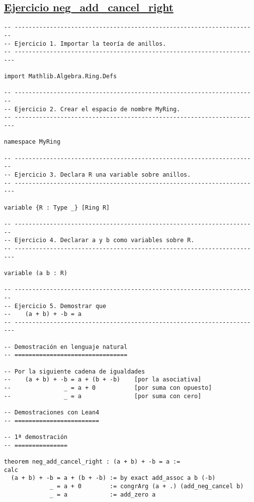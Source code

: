 \subsection{\href{./src/Basicos/neg\_add\_cancel\_right.lean}{Ejercicio neg\_add\_cancel\_right}}
\label{sec:org4feba4b}
\begin{verbatim}
-- ---------------------------------------------------------------------
-- Ejercicio 1. Importar la teoría de anillos.
-- ----------------------------------------------------------------------

import Mathlib.Algebra.Ring.Defs

-- ---------------------------------------------------------------------
-- Ejercicio 2. Crear el espacio de nombre MyRing.
-- ----------------------------------------------------------------------

namespace MyRing

-- ---------------------------------------------------------------------
-- Ejercicio 3. Declara R una variable sobre anillos.
-- ----------------------------------------------------------------------

variable {R : Type _} [Ring R]

-- ---------------------------------------------------------------------
-- Ejercicio 4. Declarar a y b como variables sobre R.
-- ----------------------------------------------------------------------

variable (a b : R)

-- ---------------------------------------------------------------------
-- Ejercicio 5. Demostrar que
--    (a + b) + -b = a
-- ----------------------------------------------------------------------

-- Demostración en lenguaje natural
-- ================================

-- Por la siguiente cadena de igualdades
--    (a + b) + -b = a + (b + -b)    [por la asociativa]
--               _ = a + 0           [por suma con opuesto]
--               _ = a               [por suma con cero]

-- Demostraciones con Lean4
-- ========================

-- 1ª demostración
-- ===============

theorem neg_add_cancel_right : (a + b) + -b = a :=
calc
  (a + b) + -b = a + (b + -b) := by exact add_assoc a b (-b)
             _ = a + 0        := congrArg (a + .) (add_neg_cancel b)
             _ = a            := add_zero a


\end{verbatim}

